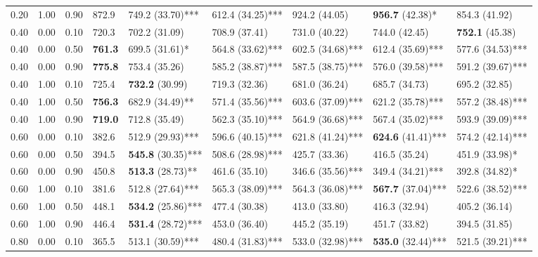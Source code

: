 \documentclass{article}
\begin{document}
\begin{landscape}
\begin{table}[b]
{\begin{tabular}{rrrllllll}
  0.20 & 1.00 & 0.90 & 872.9            & 749.2 (33.70)*** & 612.4 (34.25)*** & 924.2 (44.05)    & \textbf{956.7} (42.38)*   & 854.3 (41.92)    \\ 
  0.40 & 0.00 & 0.10 & 720.3            & 702.2 (31.09)    & 708.9 (37.41)    & 731.0 (40.22)    & 744.0 (42.45)    & \textbf{752.1} (45.38)    \\ 
  0.40 & 0.00 & 0.50 & \textbf{761.3}            & 699.5 (31.61)*   & 564.8 (33.62)*** & 602.5 (34.68)*** & 612.4 (35.69)*** & 577.6 (34.53)*** \\ 
  0.40 & 0.00 & 0.90 & \textbf{775.8}            & 753.4 (35.26)    & 585.2 (38.87)*** & 587.5 (38.75)*** & 576.0 (39.58)*** & 591.2 (39.67)*** \\ 
  0.40 & 1.00 & 0.10 & 725.4            & \textbf{732.2} (30.99)    & 719.3 (32.36)    & 681.0 (36.24)    & 685.7 (34.73)    & 695.2 (32.85)    \\ 
  0.40 & 1.00 & 0.50 & \textbf{756.3}            & 682.9 (34.49)**  & 571.4 (35.56)*** & 603.6 (37.09)*** & 621.2 (35.78)*** & 557.2 (38.48)*** \\ 
  0.40 & 1.00 & 0.90 & \textbf{719.0}            & 712.8 (35.49)    & 562.3 (35.10)*** & 564.9 (36.68)*** & 567.4 (35.02)*** & 593.9 (39.09)*** \\ 
  0.60 & 0.00 & 0.10 & 382.6            & 512.9 (29.93)*** & 596.6 (40.15)*** & 621.8 (41.24)*** & \textbf{624.6} (41.41)*** & 574.2 (42.14)*** \\ 
  0.60 & 0.00 & 0.50 & 394.5            & \textbf{545.8} (30.35)*** & 508.6 (28.98)*** & 425.7 (33.36)    & 416.5 (35.24)    & 451.9 (33.98)*   \\ 
  0.60 & 0.00 & 0.90 & 450.8            & \textbf{513.3} (28.73)**  & 461.6 (35.10)    & 346.6 (35.56)*** & 349.4 (34.21)*** & 392.8 (34.82)*   \\ 
  0.60 & 1.00 & 0.10 & 381.6            & 512.8 (27.64)*** & 565.3 (38.09)*** & 564.3 (36.08)*** & \textbf{567.7} (37.04)*** & 522.6 (38.52)*** \\ 
  0.60 & 1.00 & 0.50 & 448.1            & \textbf{534.2} (25.86)*** & 477.4 (30.38)    & 413.0 (33.80)    & 416.3 (32.94)    & 405.2 (36.14)    \\ 
  0.60 & 1.00 & 0.90 & 446.4            & \textbf{531.4} (28.72)*** & 453.0 (36.40)    & 445.2 (35.19)    & 451.7 (33.82)    & 394.5 (31.85)    \\ 
  0.80 & 0.00 & 0.10 & 365.5            & 513.1 (30.59)*** & 480.4 (31.83)*** & 533.0 (32.98)*** & \textbf{535.0} (32.44)*** & 521.5 (39.21)*** \\ 

\end{tabular}}
\end{table}
\end{landscape}
\end{document}
